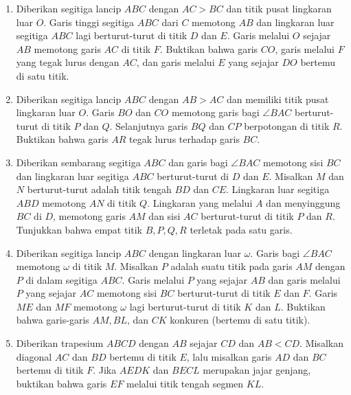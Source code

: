 \documentclass[11pt]{scrartcl}
\begin{document}
\begin{enumerate}
		\item
		Diberikan segitiga lancip $ABC$ dengan $AC > BC$ dan titik pusat lingkaran luar $O$. Garis tinggi segitiga $ABC$ dari $C$ memotong $AB$ dan lingkaran luar segitiga $ABC$ lagi berturut-turut di titik $D$ dan $E$. Garis melalui $O$ sejajar $AB$ memotong garis $AC$ di titik $F$. Buktikan bahwa garis $CO$, garis melalui $F$ yang tegak lurus dengan $AC$, dan garis melalui $E$ yang sejajar $DO$ bertemu di satu titik.
		
		\item
		Diberikan segitiga lancip $ABC$ dengan $AB > AC$ dan memiliki titik pusat lingkaran luar $O$. Garis $BO$ dan $CO$ memotong garis bagi $\angle BAC$ berturut-turut di titik $P$ dan $Q$. Selanjutnya garis $BQ$ dan $CP$ berpotongan di titik $R$. Buktikan bahwa garis $AR$ tegak lurus terhadap garis $BC$.
		
		\item
		Diberikan sembarang segitiga $ABC$ dan garis bagi $\angle BAC$ memotong sisi $BC$ dan lingkaran luar segitiga $ABC$ berturut-turut di $D$ dan $E$. Misalkan $M$ dan $N$ berturut-turut adalah titik tengah $BD$ dan $CE$. Lingkaran luar segitiga $ABD$ memotong $AN$ di titik $Q$. Lingkaran yang melalui $A$ dan menyinggung $BC$ di $D$, memotong garis $AM$ dan sisi $AC$ berturut-turut di titik $P$ dan $R$. Tunjukkan bahwa empat titik $B,P,Q,R$ terletak pada satu garis.
		
		\item
		Diberikan segitiga lancip $ABC$ dengan lingkaran luar $\omega$. Garis bagi $\angle BAC$ memotong $\omega$ di titik $M$. Misalkan $P$ adalah suatu titik pada garis $AM$ dengan $P$ di dalam segitiga $ABC$. Garis melalui $P$ yang sejajar $AB$ dan garis melalui $P$ yang sejajar $AC$ memotong sisi $BC$ berturut-turut di titik $E$ dan $F$. Garis $ME$ dan $MF$ memotong $\omega$ lagi berturut-turut di titik $K$ dan $L$. Buktikan bahwa garis-garis $AM,BL$, dan $CK$ konkuren (bertemu di satu titik).
		
		\item
		Diberikan trapesium $ABCD$ dengan $AB$ sejajar $CD$ dan $AB<CD$. Misalkan diagonal $AC$ dan $BD$ bertemu di titik $E$, lalu misalkan garis $AD$ dan $BC$ bertemu di titik $F$. Jika $AEDK$ dan $BECL$ merupakan jajar genjang, buktikan bahwa garis $EF$ melalui titik tengah segmen $KL$.
		
		
	\end{enumerate}
	
	
\end{document}

